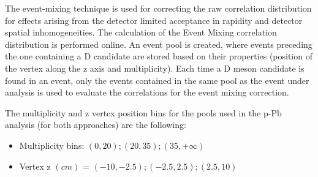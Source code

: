 %
\label{MEsection}
The event-mixing technique is used for correcting the raw correlation distribution for effects arising
from the detector limited acceptance in rapidity and detector spatial inhomogeneities. The calculation of the Event
Mixing correlation distribution is performed online. %
An event pool is created, where events preceding the one containing a D candidate are stored based on their properties (position of the vertex along the z axis and multiplicity).
Each time a D meson candidate is found in an event, only the events contained in the same pool as the event under analysis is used to evaluate the correlations for the event mixing correction.%


The multiplicity and z vertex position bins for the pools used in the p-Pb analysis (for both approaches) are the following:
\begin{itemize}
\item Multiplicity bins: $\left(0,20\right);\left(20,35\right);\left(35,+\infty\right)$
\item Vertex z $(cm)$ = $\left(-10,-2.5\right);\left(-2.5,2.5\right);\left(2.5,10\right)$
\end{itemize}

